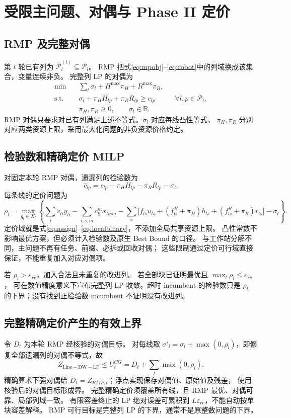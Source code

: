 \documentclass[UTF8,a4paper,11pt]{ctexart}
\begin{document}
\section{受限主问题、对偶与 Phase II 定价}
\subsection{RMP 及完整对偶}
第 $t$ 轮已有列为 $\overline{\mathcal P}_l^{(t)}\subseteq\mathcal P_l$。
RMP 把式\eqref{eq:mpobj}--\eqref{eq:robot}中的列域换成该集合，变量连续非负。
完整列 LP 的对偶为
\begin{align}
\min\quad &\sum_l\sigma_l+H^{\max}\pi_H+R^{\max}\pi_R,\label{eq:dualobj}\\
\text{s.t.}\quad &\sigma_l+\pi_H H_{lp}+\pi_R R_{lp}\geq c_{lp}
 &&\forall l,p\in\mathcal P_l,\\
&\pi_H,\pi_R\geq0,\qquad\sigma_l\in\mathbb R.
\end{align}
RMP 对偶只要求对已有列满足上述不等式。$\sigma_l$ 对应每线凸性等式，
$\pi_H,\pi_R$ 分别对应两类资源上限，采用最大化问题的非负资源价格约定。

\subsection{检验数和精确定价 MILP}
对固定本轮 RMP 对偶，遗漏列的检验数为
\begin{equation}
\bar c_{lp}=c_{lp}-\pi_H H_{lp}-\pi_R R_{lp}-\sigma_l.
\end{equation}
每条线的定价问题为
\begin{equation}
\rho_l=\max_{q_l\in X_l}\left\{
\sum_i v_{li}y_{li}-\sum_{i,s,m}c_{li}^mx_{lism}
-\sum_s\big[f_{ls}u_{ls}+(f^H_{ls}+\pi_H)h_{ls}
+(f^R_{ls}+\pi_R)r_{ls}\big]-\sigma_l\right\}.\label{eq:pricing}
\end{equation}
定价域就是式\eqref{eq:assign}--\eqref{eq:localbinary}，不添加全局共享资源上限。
凸性常数不影响最优方案，但必须计入检验数及原生 Best Bound 的口径。
与工作站分解不同，主问题不再有任务、前缀、必拆或回收对偶；
这些限制通过定价可行域直接保证，不能重复加入对应对偶项。

若 $\rho_l>\varepsilon_{rc}$，加入合法且未重复的改进列。
若全部块已证明最优且 $\max_l\rho_l\leq\varepsilon_{rc}$，
可在数值精度意义下宣布完整列 LP 收敛。超时 incumbent 的检验数只是
$\rho_l$ 的下界；没有找到正检验数 incumbent 不证明没有改进列。

\subsection{完整精确定价产生的有效上界}
令 $D_t$ 为本轮 RMP 经核验的对偶目标。
对每线取 $\sigma'_l=\sigma_l+\max(0,\rho_l)$，即修复全部遗漏列的对偶不等式，故
\begin{equation}
Z_{\mathrm{Line-DW-LP}}\leq U_t^{CG}
=D_t+\sum_l\max(0,\rho_l).\label{eq:repaired}
\end{equation}
精确算术下强对偶给 $D_t=Z_{RMP,t}$；浮点实现保存对偶值、原始值及残差，
使用核验后的对偶目标形成界。
完整精确定价须覆盖所有线，且 RMP 最优、对偶可靠、局部列域一致。
有限容差终止的 LP 绝对误差可累积到 $L\varepsilon_{rc}$，不能自动按单块容差解释。
RMP 可行目标是完整列 LP 的下界，通常不是原整数问题的下界。
\end{document}
